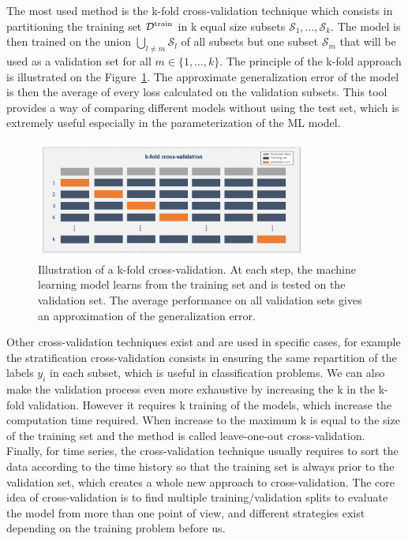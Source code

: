 \documentclass[main]{subfiles}
\begin{document}
The most used method is the k-fold cross-validation technique which consists in partitioning the training set $\mathcal{D}^{\text{train}}$ in k equal size subsets $\mathcal{S}_1,...,\mathcal{S}_k$. The model is then trained on the union $\bigcup_{l\neq m} \mathcal{S}_l$ of all subsets but one subset $\mathcal{S}_m$ that will be used as a validation set for all $m\in \{1,\ldots,k\}$. The principle of the k-fold approach is illustrated on the Figure~\ref{fgr:kfold}. The approximate generalization error of the model is then the average of every loss calculated on the validation subsets. This tool provides a way of comparing different models without using the test set, which is extremely useful especially in the parameterization of the ML model.

\begin{figure}[ht]
  \centering
    \includegraphics[width=0.8\textwidth]{figures/4-ml/cross-validation.pdf}
    \caption{Illustration of a k-fold cross-validation. At each step, the machine learning model learns from the training set and is tested on the validation set. The average performance on all validation sets gives an approximation of the generalization error.}\label{fgr:kfold}
\end{figure}

Other cross-validation techniques exist and are used in specific cases, for example the stratification cross-validation consists in ensuring the same repartition of the labels $y_i$ in each subset, which is useful in classification problems. We can also make the validation process even more exhaustive by increasing the k in the k-fold validation. However it requires k training of the models, which increase the computation time required. When increase to the maximum k is equal to the size of the training set and the method is called leave-one-out cross-validation. Finally, for time series, the cross-validation technique usually requires to sort the data according to the time history so that the training set is always prior to the validation set, which creates a whole new approach to cross-validation. The core idea of cross-validation is to find multiple training/validation splits to evaluate the model from more than one point of view, and different strategies exist depending on the training problem before us.
\end{document}
